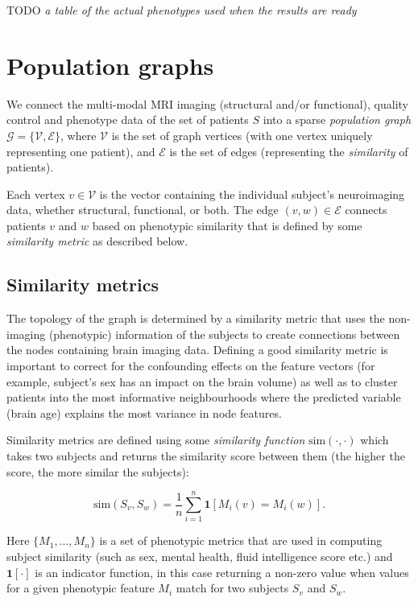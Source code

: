 TODO \textit{a table of the actual phenotypes used when the results are ready}

\section{Population graphs}
\label{population-graphs}

We connect the multi-modal MRI imaging (structural and/or functional), quality control and phenotype data of the set of patients $S$ into a sparse \textit{population graph} $\mathcal{G} = \{\mathcal{V}, \mathcal{E}\}$, where $\mathcal{V}$ is the set of graph vertices (with one vertex uniquely representing one patient), and $\mathcal{E}$ is the set of edges (representing the \textit{similarity} of patients).

Each vertex $v \in \mathcal{V}$ is the vector containing the individual subject's neuroimaging data, whether structural, functional, or both. The edge $(v, w) \in \mathcal{E}$ connects patients $v$ and $w$ based on phenotypic similarity that is defined by some \textit{similarity metric} as described below.

\subsection{Similarity metrics}
The topology of the graph is determined by a similarity metric that uses the non-imaging (phenotypic) information of the subjects to create connections between the nodes containing brain imaging data. Defining a good similarity metric is important to correct for the confounding effects on the feature vectors (for example, subject's sex has an impact on the brain volume) as well as to cluster patients into the most informative neighbourhoods where the predicted variable (brain age) explains the most variance in node features.

Similarity metrics are defined using some \textit{similarity function} $\mathrm{sim}(\cdot, \cdot)$ which takes two subjects and returns the similarity score between them (the higher the score, the more similar the subjects):

\begin{equation}
    \mathrm{sim}(S_v, S_w) = \frac{1}{n}\sum_{i=1}^{n} \mathbf{1}[M_i(v) = M_i(w)].
\end{equation}

Here $\{M_1, \dots, M_n\}$ is a set of phenotypic metrics that are used in computing subject similarity (such as sex, mental health, fluid intelligence score etc.) and $\mathbf{1}[\cdot]$ is an indicator function, in this case returning a non-zero value when values for a given phenotypic feature $M_i$ match for two subjects $S_v$ and $S_w$.

